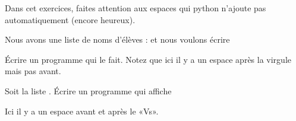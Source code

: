 
\begin{exercice}\label{exoPremiere-0051}

    Dans cet exercices, faites attention aux espaces qui python n'ajoute pas automatiquement (encore heureux).

    Nous avons une liste de noms d'élèves :  et nous voulons écrire
    \begin{quote}
    \end{quote}
    Écrire un programme qui le fait. Notez que ici il y a un espace après la virgule mais pas avant.

    Soit la liste . Écrire un programme qui affiche
    \begin{quote}
    \end{quote}
    Ici il y a un espace avant et après le  «Vs».

\end{exercice}
